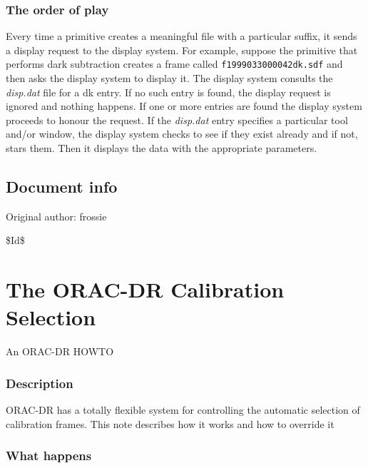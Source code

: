 \documentclass[twoside,11pt]{article}
\renewcommand{\_}{\texttt{\symbol{95}}}
\begin{document}
\subsubsection*{The order of play\label{The_ORAC-DR_Display_System_The_order_of_play}}


Every time a primitive creates a meaningful file with a particular
suffix, it sends a display request to the display system. For example,
suppose the primitive that performs dark subtraction creates a frame
called \texttt{f19990330\_00042\_dk.sdf} and then asks the display system to
display it. The display system consults the \emph{disp.dat} file for a dk
entry. If no such entry is found, the display request is ignored and
nothing happens. If one or more entries are found the display system
proceeds to honour the request. If the \emph{disp.dat} entry specifies a
particular tool and/or window, the display system checks to see if
they exist already and if not, stars them. Then it displays the data
with the appropriate parameters.

\subsection*{Document info\label{The_ORAC-DR_Display_System_Document_info}}


Original author: frossie



\$Id\$


\section{The ORAC-DR Calibration Selection\label{The_ORAC-DR_Calibration_Selection}}


An ORAC-DR HOWTO

\subsubsection*{Description\label{The_ORAC-DR_Calibration_Selection_Description}}


ORAC-DR has a totally flexible system for controlling the automatic
selection of calibration frames.  This note describes how it works and
how to override it

\subsubsection*{What happens\label{The_ORAC-DR_Calibration_Selection_What_happens}}
\end{document}
